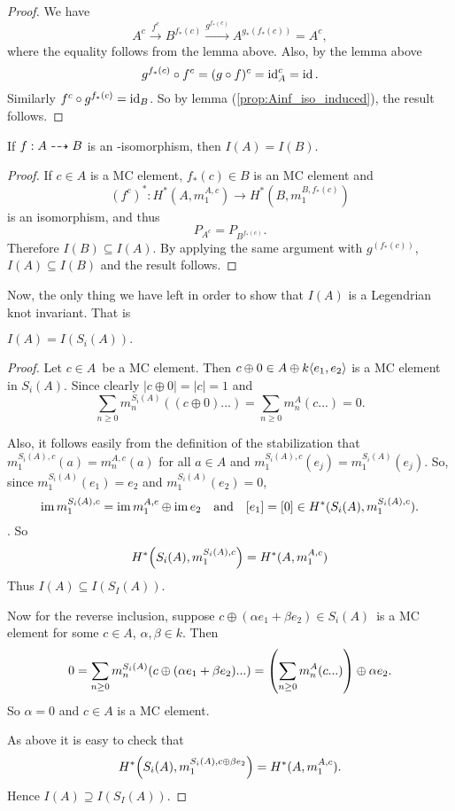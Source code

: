 \begin{proof}
We have
\[ A^c \xrightarrow{f^c} B^{f_*(c)} \xrightarrow{g^{f_*(c)}}
A^{g_*(f_*(c))} = A^c,  \]
where the equality follows from the lemma above. Also, by the lemma above 
\[ g^{f_*(c)} \circ f^c = (g \circ f)^c = \operatorname{id}_A^c = \operatorname{id}. \]
Similarly $f^c \circ g^{f_*(c)} = \operatorname{id}_B$. So by lemma
(\ref{prop:Ainf_iso_induced}), the result follows.
\end{proof}

\begin{lemma}
If $f: A \dashrightarrow B$ is an \Ainf-isomorphism, then $I(A) = I(B)$.
\end{lemma}

\begin{proof}
If $c \in A$ is a MC element, $f_*(c) \in B$ is an MC element and 
\[ (f^c)^* : H^*(A, m_1^{A,c}) \to H^*(B, m_1^{B,f_*(c)}) \]
is an isomorphism, and thus 
\[ P_{A^c} = P_{B^{f_*(c)}}. \]
Therefore $I(B) \subseteq I(A)$. By applying the same argument with
$g^{(f_*(c))}$, \\ $I(A) \subseteq I(B)$ and the result follows. 
\end{proof}

Now, the only thing we have left in order to show that $I(A)$ is a Legendrian
knot invariant. That is %

\begin{lemma}
$I(A) = I(S_i(A)).$
\end{lemma}

\begin{proof}
Let $c \in A$ be a MC element. 
Then $c \oplus 0 \in A \oplus k\langle e_1,e_2 \rangle$ is a MC element in $S_i(A)$.
Since clearly $|c\oplus 0| = |c|= 1$ and 
\[\sum_{n\ge 0} m^{S_i(A)}_n((c\oplus 0)...) = \sum_{n\ge 0} m^A_n(c...) = 0.\]

Also, it follows easily from the definition of the stabilization that
$m^{S_i(A), c}_1 (a) = m^{A,c}_n (a)$ for all $a \in A$ and $m^{S_i(A),
c}_1(e_j) = m^{S_i(A)}_1(e_j)$. So, since $m^{S_i(A)}_1(e_1) = e_2$ and
$m^{S_i(A)}_1(e_2) = 0$, 
\[ \operatorname{im} m^{S_i(A), c}_1 = \operatorname{im} m^{A,c}_1 \oplus \operatorname{im} e_2 
\quad\text{and}\quad [e_1] = [0] \in H^*(S_i(A), m^{S_i(A),c}_1). \].
So 
\[ H^*\qty(S_i(A), m^{S_i(A),c}_1) = H^*(A, m^{A,c}_1) \]
Thus $I(A) \subseteq I(S_I(A))$. 

Now for the reverse inclusion, suppose $c \oplus (\alpha e_1 + \beta e_2) \in S_i(A)$ is a
MC element for some $c\in A$, $\alpha, \beta \in k$. Then 
\[ 0 = \sum_{n \ge 0} m^{S_i(A)}_n \qty(c \oplus (\alpha e_1 + \beta e_2)...) =
\qty( \sum_{n \ge 0} m^A_n(c...) ) \oplus \alpha e_2. \]
So $\alpha = 0$ and $c \in A$ is a MC element. 

As above it is easy to check that 
\[ H^*\qty(S_i(A), m^{S_i(A),c\oplus \beta e_2}_1) = H^*(A, m^{A,c}_1). \]
Hence $I(A) \supseteq I(S_I(A))$.
\end{proof}

